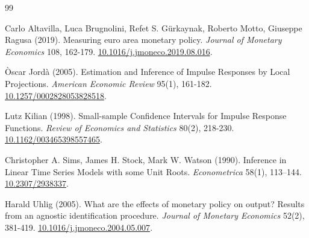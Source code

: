 \begin{thebibliography}{99}

 Carlo Altavilla, Luca Brugnolini, Refet S. Gürkaynak, Roberto Motto, Giuseppe Ragusa (2019). Measuring euro area monetary policy. \textit{Journal of Monetary Economics} 108, 162-179. \href{https://doi.org/10.1016/j.jmoneco.2019.08.016}{10.1016/j.jmoneco.2019.08.016}.

 Òscar Jordà (2005). Estimation and Inference of Impulse Responses by Local Projections. \textit{American Economic Review} 95(1), 161-182. \href{https://doi.org/10.1257/0002828053828518}{10.1257/0002828053828518}.

 Lutz Kilian (1998). Small-sample Confidence Intervals for Impulse Response Functions. \textit{Review of Economics and Statistics} 80(2), 218-230. \href{https://doi.org/10.1162/003465398557465}{10.1162/003465398557465}.

 Christopher A. Sims, James H. Stock, Mark W. Watson (1990). Inference in Linear Time Series Models with some Unit Roots. \textit{Econometrica} 58(1), 113--144. \href{https://doi.org/10.2307/2938337}{10.2307/2938337}.

 Harald Uhlig (2005). What are the effects of monetary policy on output? Results from an agnostic identification procedure. \textit{Journal of Monetary Economics} 52(2), 381-419. \href{https://doi.org/10.1016/j.jmoneco.2004.05.007}{10.1016/j.jmoneco.2004.05.007}.

\end{thebibliography}
